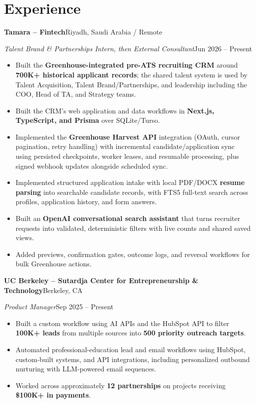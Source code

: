 \documentclass[a4paper,10pt]{article}
\newcommand{\entry}[4]{%
  \textbf{#1}\hfill #2\par
  \textit{#3}\hfill #4\par
}
\begin{document}
\section{Experience}
\entry{Tamara -- Fintech}{Riyadh, Saudi Arabia / Remote}
{Talent Brand \& Partnerships Intern, then External Consultant}{Jun 2026 -- Present}
\begin{itemize}
  \item Built the \textbf{Greenhouse-integrated pre-ATS recruiting CRM} around \textbf{700K+ historical applicant records}; the shared talent system is used by Talent Acquisition, Talent Brand/Partnerships, and leadership including the COO, Head of TA, and Strategy teams.
  \item Built the CRM's web application and data workflows in \textbf{Next.js, TypeScript, and Prisma} over SQLite/Turso.
  \item Implemented the \textbf{Greenhouse Harvest API} integration (OAuth, cursor pagination, retry handling) with incremental candidate/application sync using persisted checkpoints, worker leases, and resumable processing, plus signed webhook updates alongside scheduled sync.
  \item Implemented structured application intake with local PDF/DOCX \textbf{resume parsing} into searchable candidate records, with FTS5 full-text search across profiles, application history, and form answers.
  \item Built an \textbf{OpenAI conversational search assistant} that turns recruiter requests into validated, deterministic filters with live counts and shared saved views.
  \item Added previews, confirmation gates, outcome logs, and reversal workflows for bulk Greenhouse actions.
\end{itemize}
\entry{UC Berkeley -- Sutardja Center for Entrepreneurship \& Technology}{Berkeley, CA}
{Product Manager}{Sep 2025 -- Present}
\begin{itemize}
  \item Built a custom workflow using AI APIs and the HubSpot API to filter \textbf{100K+ leads} from multiple sources into \textbf{500 priority outreach targets}.
  \item Automated professional-education lead and email workflows using HubSpot, custom-built systems, and API integrations, including personalized outbound nurturing with LLM-powered email sequences.
  \item Worked across approximately \textbf{12 partnerships} on projects receiving \textbf{\$100K+ in payments}.
\end{itemize}
\end{document}
